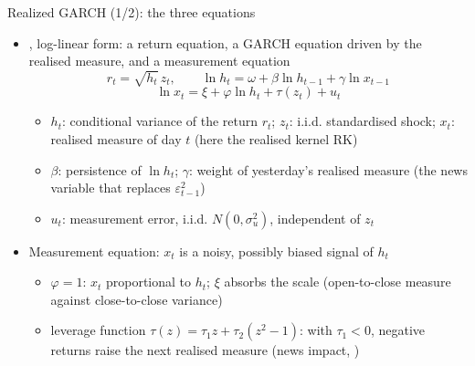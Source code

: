 \begin{frame}{Realized GARCH (1/2): the three equations}
\itemsize{\footnotesize}
\begin{itemize}
    \item {}, log-linear form: a return equation, a GARCH equation driven by the realised measure, and a measurement equation
    \[ r_t = \sqrt{h_t}\,z_t, \qquad \ln h_t = \omega + \beta\ln h_{t-1} + \gamma\ln x_{t-1} \]
    \[ \ln x_t = \xi + \varphi\ln h_t + \tau(z_t) + u_t \]
    \begin{itemize}
        \item $h_t$: conditional variance of the return $r_t$; $z_t$: i.i.d. standardised shock; $x_t$: realised measure of day $t$ (here the realised kernel RK)
        \item $\beta$: persistence of $\ln h_t$; $\gamma$: weight of yesterday's realised measure (the news variable that replaces $\varepsilon^2_{t-1}$)
        \item $u_t$: measurement error, i.i.d. $N(0, \sigma^2_u)$, independent of $z_t$
    \end{itemize}
    \item Measurement equation: $x_t$ is a noisy, possibly biased signal of $h_t$
    \begin{itemize}
        \item $\varphi = 1$: $x_t$ proportional to $h_t$; $\xi$ absorbs the scale (open-to-close measure against close-to-close variance)
        \item leverage function $\tau(z) = \tau_1z + \tau_2(z^2 - 1)$: with $\tau_1 < 0$, negative returns raise the next realised measure (news impact, )
    \end{itemize}
\end{itemize}
\end{frame}

